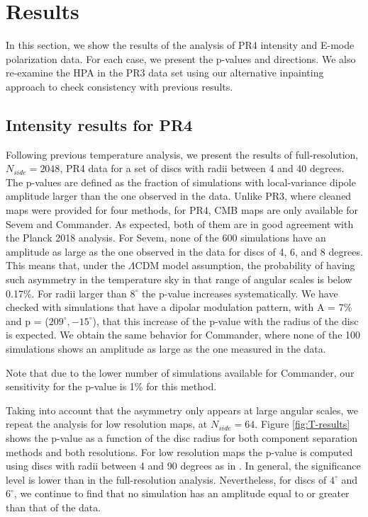 \section{Results} \label{Res}

In this section, we show the results of the analysis of PR4 intensity and E-mode polarization data. For each case, we present the p-values and directions. We also re-examine the HPA in the PR3 data set using our alternative inpainting approach to check consistency with previous results.

\subsection{Intensity results for PR4}

Following previous temperature analysis, we present the results of full-resolution, $N_{side} = 2048$, PR4 data for a set of discs with radii between 4 and 40 degrees. The p-values are defined as the fraction of simulations with local-variance dipole amplitude larger than the one observed in the data. Unlike PR3, where cleaned maps were provided for four methods, for PR4, CMB maps are only available for Sevem and Commander. As expected, both of them are in good agreement with the Planck 2018 analysis. For Sevem, none of the 600 simulations have an amplitude as large as the one observed in the data for discs of 4, 6, and 8 degrees. This means that, under the $\Lambda$CDM model assumption, the probability of having such asymmetry in the temperature sky in that range of angular scales is below 0.17\%. For radii larger than $8^{\circ}$ the p-value increases systematically. We have checked with simulations that have a dipolar modulation pattern, with A = 7\% and p = ($209^{\circ}, -15^{\circ}$), that this increase of the p-value with the radius of the disc is expected. We obtain the same behavior for Commander, where none of the 100 simulations shows an amplitude as large as the one measured in the data. {Note that due to the lower number of simulations available for Commander, our sensitivity for the p-value is 1\% for this method.

Taking into account that the asymmetry only appears at large angular scales, we repeat the analysis for low resolution maps, at $N_{side} = 64$. Figure \ref{fig:T-results} shows the p-value as a function of the disc radius for both component separation methods and both resolutions. For low resolution maps the p-value is computed using discs with radii between 4 and 90 degrees as in \cite{Planck:2019evm}. In general, the significance level is lower than in the full-resolution analysis. Nevertheless, for discs of $4^{\circ}$ and $6^{\circ}$, we continue to find that no simulation has an amplitude equal to or greater than that of the data.

}
